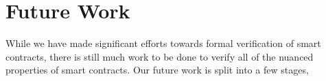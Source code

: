 \section{Future Work}
While we have made significant efforts towards formal verification of smart
contracts, there is still much work to be done to verify all of the nuanced properties
of smart contracts. Our future work is split into a few stages,

